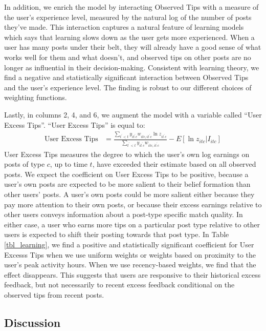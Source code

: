 In addition, we enrich the model by interacting Observed Tips with a measure of the user's experience level, measured by the natural log of the number of posts they've made. This interaction captures a natural feature of learning models which says that learning slows down as the user gets more experienced. When a user has many posts under their belt, they will already have a good sense of what works well for them and what doesn't, and observed tips on other posts are no longer as influential in their decision-making. Consistent with learning theory, we find a negative and statistically significant interaction between Observed Tips and the user's experience level. The finding is robust to our different choices of weighting functions.

Lastly, in columns 2, 4, and 6, we augment the model with a variable called ``User Excess Tips''.  ``User Excess Tips'' is equal to:
\begin{align}
\text{User Excess Tips} &= \frac{\sum_{t^\prime < t} y_{it^\prime c} w_{itc, it^\prime c} \ln z_{it^\prime c}}{\sum_{t^\prime < t} y_{it^\prime c} w_{itc, it^\prime c} } - E\left[ \ln z_{itc} | I_{itc} \right] 
\end{align}
User Excess Tips measures the degree to which the user's own log earnings on posts of type $c$, up to time $t$, have exceeded their estimate based on all observed posts. We expect the coefficient on User Excess Tips to be positive, because a user's own posts are expected to be more salient to their belief formation than other users' posts. A user's own posts could be more salient either because they pay more attention to their own posts, or because their excess earnings relative to other users conveys information about a post-type specific match quality. In either case, a user who earns more tips on a particular post type relative to other users is expected to shift their posting towards that post type. In Table \ref{tbl_learning}, we find a positive and statistically significant coefficient for User Excesss Tips when we use uniform weights or weights based on proximity to the user's peak activity hours. When we use recency-based weights, we find that the effect disappears. This suggests that users are responsive to their historical excess feedback, but not necessarily to recent excess feedback conditional on the observed tips from recent posts. 

\subsection{Discussion}

